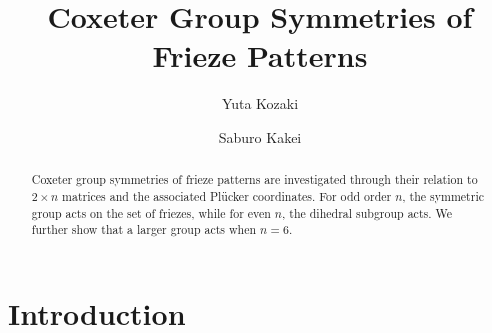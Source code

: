 \documentclass[11pt]{amsart}
\title{Coxeter Group Symmetries of Frieze Patterns}
\author{Yuta Kozaki}
\author{Saburo Kakei}
\theoremstyle{plain}
\theoremstyle{definition}
\theoremstyle{remark}
\begin{document}
\maketitle

\begin{abstract}
Coxeter group symmetries of frieze patterns 
are investigated through their relation to $2\times n$ matrices
and the associated Pl\"ucker coordinates. 
For odd order $n$, the symmetric group  
acts on the set of friezes, while for even $n$, 
the dihedral subgroup acts. 
We further show that 
a larger group acts when $n = 6$.
\end{abstract}

\section{Introduction}
\end{document}
